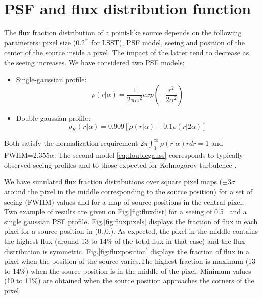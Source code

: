\documentclass[\docopts]{\docclass}
\begin{document}
\section{PSF and flux distribution function}
\label{sec:psfflux}
The flux fraction distribution of a point-like source depends on the following  parameters: pixel size (0.2$^{"}$ for LSST), PSF model, seeing and position of the center of the source inside a pixel. The impact of the latter tend to decrease as the seeing increases. We have considered two PSF models:
\begin{itemize}
\item Single-gaussian profile:
  \begin{equation}
    \rho(r|\alpha)={\frac{1}{2\pi\alpha^2}}exp\left(-{\frac{r^2}{2\alpha^2}}\right) \label{eq:singlegauss}
   \end{equation}
\item Double-gaussian profile:
\begin{equation}
  \rho_K(r|\alpha)= 0.909 \left[\rho(r|\alpha)+0.1\rho(r|2\alpha)\right] \label{eq:doublegauss}
  \end{equation}
 \end{itemize}
Both satisfy the normalization requirement $ 2\pi \int^{\infty}_{0} \rho(r|\alpha) r dr = 1$ and FWHM=2.355$\alpha$. The second model \eqref{eq:doublegauss} corresponds to typically-observed seeing profiles and to those expected for Kolmogorov turbulence \cite{LSE40}. \par
We have simulated flux fraction distributions over square pixel maps ($\pm 3 \sigma$ around the pixel in the middle corresponding to the source position) for a set of seeing (FWHM) values and for a map of source positions in the central pixel.  Two example of results are given on Fig.\ref{fig:fluxdist} for a seeing of 0.5\arcsec~ and a single gaussian PSF profile. Fig.\ref{fig:fluxpixels} displays the fraction of flux in each pixel for a source position in (0.,0.). As expected, the pixel in the middle contains the highest flux (around 13 to 14\% of the total flux in that case) and the flux distribution is symmetric.  Fig.\ref{fig:fluxposition} displays the fraction of flux in a pixel when the position of the source varies.The highest fraction is maximum (13 to 14\%) when the source position is in the middle of the pixel. Minimum values (\~10 to 11\%) are obtained when the source position approaches the corners of the pixel.
\end{document}

